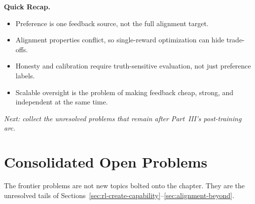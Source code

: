 \begin{quickrecap}
\textbf{Quick Recap.}
\begin{itemize}[nosep,leftmargin=1.5em]
  \item Preference is one feedback source, not the full alignment target.
  \item Alignment properties conflict, so single-reward optimization can hide trade-offs.
  \item Honesty and calibration require truth-sensitive evaluation, not just preference labels.
  \item Scalable oversight is the problem of making feedback cheap, strong, and independent at the same time.
\end{itemize}
\textit{Next: collect the unresolved problems that remain after Part~III's post-training arc.}
\end{quickrecap}


\section{Consolidated Open Problems}
\label{sec:open-problems}

The frontier problems are not new topics bolted onto the chapter. They are the unresolved tails of Sections~\ref{sec:rl-create-capability}--\ref{sec:alignment-beyond}.

